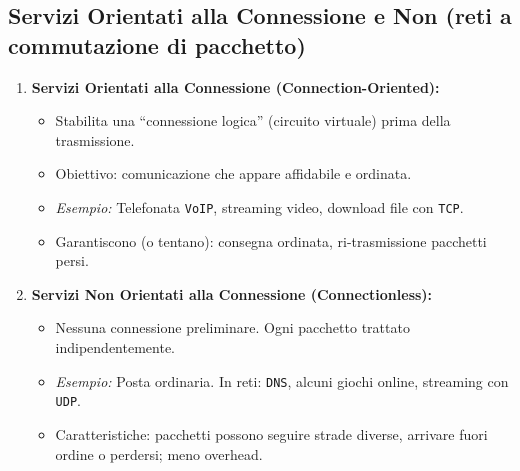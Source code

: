 \documentclass{article}
\begin{document}
\subsection{Servizi Orientati alla Connessione e Non (reti a commutazione di pacchetto)}
\begin{enumerate}
    \item \textbf{Servizi Orientati alla Connessione (Connection-Oriented):}
    \begin{itemize}
        \item Stabilita una “connessione logica” (circuito virtuale) prima della trasmissione.
        \item Obiettivo: comunicazione che appare affidabile e ordinata.
        \item \textit{Esempio:} Telefonata \texttt{VoIP}, streaming video, download file con \texttt{TCP}.
        \item Garantiscono (o tentano): consegna ordinata, ri-trasmissione pacchetti persi.
    \end{itemize}
    \item \textbf{Servizi Non Orientati alla Connessione (Connectionless):}
    \begin{itemize}
        \item Nessuna connessione preliminare. Ogni pacchetto trattato indipendentemente.
        \item \textit{Esempio:} Posta ordinaria. In reti: \texttt{DNS}, alcuni giochi online, streaming con \texttt{UDP}.
        \item Caratteristiche: pacchetti possono seguire strade diverse, arrivare fuori ordine o perdersi; meno overhead.
    \end{itemize}
\end{enumerate}
\end{document}
